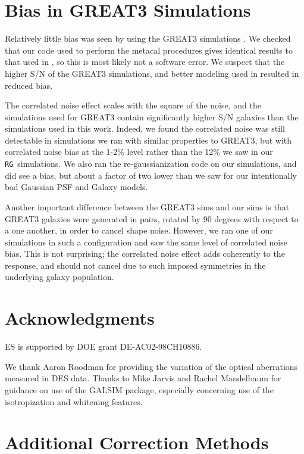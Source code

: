 \documentclass[usegraphicx,usenatbib]{mn2e}
\newcommand{\rgsim}{\texttt{RG}}
\begin{document}
\section{Bias in GREAT3 Simulations}

Relatively little bias was seen by \cite{HuffMcal} using the GREAT3 simulations
\citep{great3}.  We checked that our code used to perform the metacal
procedures gives identical results to that used in \cite{HuffMcal}, so this is
most likely not a software error.  We
suspect that the higher S/N of the GREAT3 simulations, and better modeling used
in \cite{HuffMcal} resulted in reduced bias.

The correlated noise effect scales with the square of the noise, and the
simulations used for GREAT3 contain significantly higher S/N galaxies than the
simulations used in this work.  Indeed, we found the correlated noise was still
detectable in simulations we ran with similar properties to GREAT3, but with
correlated noise bias at the 1-2\% level rather than the 12\% we saw in our
\rgsim\ simulations.  We also ran the re-gaussianization code on our
simulations, and did see a bias, but about a factor of two lower than we saw
for our intentionally bad Gaussian PSF and Galaxy models.

Another important difference between the GREAT3 sims and our sims is that
GREAT3 galaxies were generated in pairs, rotated by 90 degrees with respect to
a one another, in order to cancel shape noise.  However, we ran one of our
simulations in such a configuration and saw the same level of correlated noise
bias.  This is not surprising; the correlated noise effect adds coherently to
the response, and should not cancel due to such imposed symmetries in the
underlying galaxy population.

\section*{Acknowledgments}

ES is supported by DOE grant DE-AC02-98CH10886.

We thank Aaron Roodman for providing the variation of the optical aberrations
measured in DES data.  Thanks to Mike Jarvis and Rachel Mandelbaum for guidance
on use of the GALSIM package, especially concerning use of the isotropization
and whitening features.


\appendix

\section{Additional Correction Methods} \label{sec:altcorr}
\end{document}
